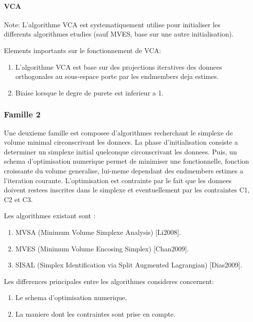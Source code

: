 \paragraph{VCA} 
Note: L'algorithme VCA est systematiquement
utilise pour initialiser les differents algorithmes etudies (sauf
MVES, base sur une autre initialisation).

Elements importants sur le fonctionnement de VCA: 
\begin{enumerate}
\item {L'algorithme VCA
est base sur des projections iteratives des donnees orthogonales au
sous-espace porte par les endmembers deja estimes.}
\item {Biaise lorsque le
degre de purete est inferieur a 1.}

\end{enumerate}  

\subsubsection{Famille 2} 
Une deuxieme famille est composee d'algorithmes recherchant le
simplexe de volume minimal circonscrivant les donnees. La phase
d'initialisation consiste a determiner un simplexe initial quelconque
circonscrivant les donnees. Puis, un schema d'optimisation numerique
permet de minimiser une fonctionnelle, fonction croissante du volume
generalise, lui-meme dependant des endmembers estimes a l'iteration
courante. L'optimisation est contrainte par le fait que les donnees
doivent restees inscrites dans le simplexe et eventuellement par les
contraintes C1, C2 et C3.

Les algorithmes existant sont : 
\begin{enumerate}
\item {MVSA (Minimum Volume Simplexe
Analysis) [Li2008].}
\item { MVES (Minimum Volume Encosing Simplex)
[Chan2009].}
\item {SISAL (Simplex Identification via Split Augmented
Lagrangian) [Dias2009].}
\end{enumerate}  
  
Les differences principales entre les algorithmes consideres
concernent: 
\begin{enumerate}
\item {Le schema d'optimisation numerique.}
\item {La maniere dont les
contraintes sont prise en compte.}

\end{enumerate}  

